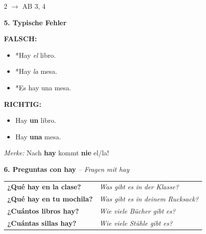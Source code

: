 \documentclass[11pt, a4paper]{article}
\newcommand{\seriftext}[1]{{\fontfamily{ppl}\selectfont #1}}
\newcommand{\es}[1]{\seriftext{\textbf{#1}}}
\newcommand{\de}[1]{\textit{\textcolor{akzent}{#1}}}
\newcommand{\abmark}[1]{{\footnotesize\textcolor{akzent}{$\rightarrow$ AB #1}}}
\newcommand{\abschnitt}[2]{\noindent\textbf{\large #1. #2}}
\begin{document}
\begin{multicols}{2}
\abmark{3, 4}

\vspace{8pt}

\abschnitt{5}{Typische Fehler}

\vspace{4pt}

\begin{fehlerbox}
\textbf{FALSCH:}
\begin{itemize}[leftmargin=1.2em, itemsep=1pt]
    \item[\textcolor{colorrojo}{$\times$}] \textcolor{colorrojo}{*Hay \textit{el} libro.}
    \item[\textcolor{colorrojo}{$\times$}] \textcolor{colorrojo}{*Hay \textit{la} mesa.}
    \item[\textcolor{colorrojo}{$\times$}] \textcolor{colorrojo}{*Es hay una mesa.}
\end{itemize}

\vspace{3pt}

\textbf{RICHTIG:}
\begin{itemize}[leftmargin=1.2em, itemsep=1pt]
    \item[\textcolor{colorverde}{\checkmark}] \textcolor{colorverde}{Hay \textbf{un} libro.}
    \item[\textcolor{colorverde}{\checkmark}] \textcolor{colorverde}{Hay \textbf{una} mesa.}
\end{itemize}
\end{fehlerbox}

{\footnotesize\textit{Merke:} Nach \es{hay} kommt \textbf{nie} el/la!}

\end{multicols}


\vspace{4pt}

\abschnitt{6}{Preguntas con hay} \de{-- Fragen mit hay}

\vspace{4pt}

\begin{vokabelbox}
{\small
\begin{tabular}{@{}p{6.5cm}p{6.5cm}@{}}
\es{¿Qué hay en la clase?} & \de{Was gibt es in der Klasse?} \\[0.4em]
\es{¿Qué hay en tu mochila?} & \de{Was gibt es in deinem Rucksack?} \\[0.4em]
\es{¿Cuántos libros hay?} & \de{Wie viele Bücher gibt es?} \\[0.4em]
\es{¿Cuántas sillas hay?} & \de{Wie viele Stühle gibt es?} \\
\end{tabular}}
\end{vokabelbox}
\end{document}
